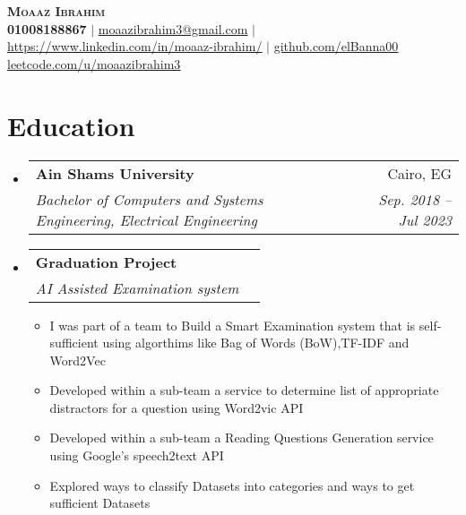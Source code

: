 \documentclass[letterpaper,11pt]{article}
\makeatletter
\newcommand{\resumeItem}[1]{
  \item\small{
    {#1 \vspace{-2pt}}
  }
}
\newcommand{\resumeSubheading}[4]{
  \vspace{-2pt}\item
    \begin{tabular*}{0.97\textwidth}[t]{l@{\extracolsep{\fill}}r}
      \textbf{#1} & #2 \\
      \textit{\small#3} & \textit{\small #4} \\
    \end{tabular*}\vspace{-7pt}
}
\newcommand{\resumeSubHeadingListStart}{\begin{itemize}[leftmargin=0.15in, label={}]}
\newcommand{\resumeSubHeadingListEnd}{\end{itemize}}
\newcommand{\resumeItemListStart}{\begin{itemize}}
\newcommand{\resumeItemListEnd}{\end{itemize}\vspace{-5pt}}
\makeatother
\begin{document}


\begin{center}
    \textbf{\huge \scshape Moaaz Ibrahim} \\ \vspace{1pt}
    \small \textbf{01008188867} $|$ \href{}{\underline{moaazibrahim3@gmail.com}} $|$ 
    \href{https://linkedin.com/in/moaaz-ibrahim-58990b1b7}{\underline{https://www.linkedin.com/in/moaaz-ibrahim/}} $|$
    \href{https://github.com/elBanna00}{\underline{github.com/elBanna00}}
    \href{https://leetcode.com/u/moaazibrahim3/}{\underline{leetcode.com/u/moaazibrahim3}}
\end{center}


\section{Education}
  \resumeSubHeadingListStart
    \resumeSubheading
      {Ain Shams University}{Cairo, EG}
      {Bachelor of Computers and Systems Engineering, Electrical Engineering}{Sep. 2018 -- Jul 2023}
    \resumeSubheading
      {Graduation Project}{}
      {AI Assisted Examination system}{}
            \resumeItemListStart
        \resumeItem{I was part of a team to Build a Smart Examination system that is self-sufficient using algorthims like Bag of Words (BoW),TF-IDF and Word2Vec
 }
        \resumeItem{Developed within a sub-team a service to determine list of appropriate distractors for a question using Word2vic API}
        \resumeItem{Developed within a sub-team a Reading Questions Generation service using Google's speech2text API}
        \resumeItem{Explored ways to classify Datasets into categories and ways to get sufficient Datasets}
      \resumeItemListEnd
  \resumeSubHeadingListEnd



      
\end{document}
